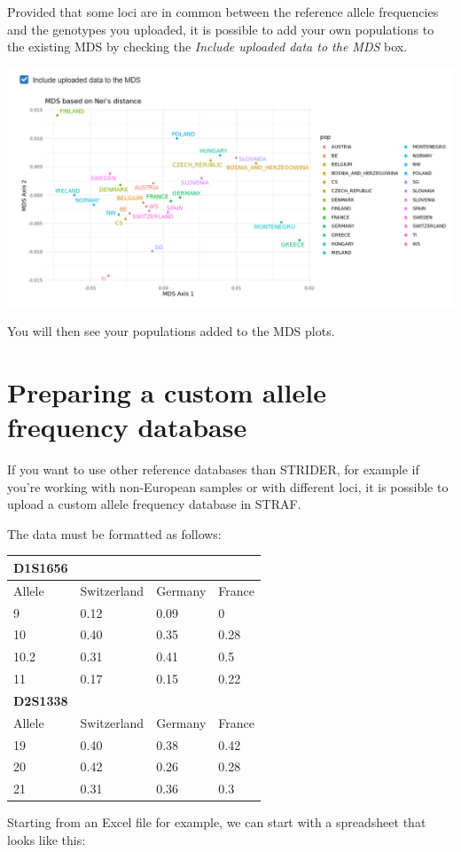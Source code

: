 \documentclass[
]{book}
\begin{document}
Provided that some loci are in common between the reference allele frequencies and
the genotypes you uploaded, it is possible to add your own populations to the existing MDS
by checking the \emph{Include uploaded data to the MDS} box.

\includegraphics[width=0.8\linewidth]{img/capture_ref_pop_3}

You will then see your populations added to the MDS plots.

\hypertarget{preparing-a-custom-allele-frequency-database}{%
\section{Preparing a custom allele frequency database}\label{preparing-a-custom-allele-frequency-database}}

If you want to use other reference databases than STRIDER, for example if you're working with
non-European samples or with different loci, it is possible to upload a custom
allele frequency database in STRAF.

The data must be formatted as follows:

\begin{longtable}[]{@{}llll@{}}
\toprule
D1S1656 & & &\tabularnewline
\midrule
\endhead
Allele & Switzerland & Germany & France\tabularnewline
9 & 0.12 & 0.09 & 0\tabularnewline
10 & 0.40 & 0.35 & 0.28\tabularnewline
10.2 & 0.31 & 0.41 & 0.5\tabularnewline
11 & 0.17 & 0.15 & 0.22\tabularnewline
\textbf{D2S1338} & & &\tabularnewline
Allele & Switzerland & Germany & France\tabularnewline
19 & 0.40 & 0.38 & 0.42\tabularnewline
20 & 0.42 & 0.26 & 0.28\tabularnewline
21 & 0.31 & 0.36 & 0.3\tabularnewline
\bottomrule
\end{longtable}

Starting from an Excel file for example, we can start with a spreadsheet that looks
like this:
\end{document}
